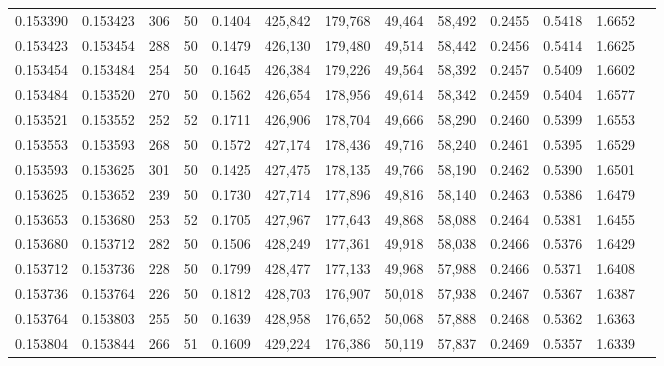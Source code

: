 \begin{tabular}{rrrrrrrrrrrrr}
0.153390 & 0.153423 &   306 &  50 &                                     0.1404 & 425,842 & 179,768 &  49,464 &  58,492 & 0.2455 & 0.5418 & 1.6652 \\
0.153423 & 0.153454 &   288 &  50 &                                     0.1479 & 426,130 & 179,480 &  49,514 &  58,442 & 0.2456 & 0.5414 & 1.6625 \\
0.153454 & 0.153484 &   254 &  50 &                                     0.1645 & 426,384 & 179,226 &  49,564 &  58,392 & 0.2457 & 0.5409 & 1.6602 \\
0.153484 & 0.153520 &   270 &  50 &                                     0.1562 & 426,654 & 178,956 &  49,614 &  58,342 & 0.2459 & 0.5404 & 1.6577 \\
0.153521 & 0.153552 &   252 &  52 &                                     0.1711 & 426,906 & 178,704 &  49,666 &  58,290 & 0.2460 & 0.5399 & 1.6553 \\
0.153553 & 0.153593 &   268 &  50 &                                     0.1572 & 427,174 & 178,436 &  49,716 &  58,240 & 0.2461 & 0.5395 & 1.6529 \\
0.153593 & 0.153625 &   301 &  50 &                                     0.1425 & 427,475 & 178,135 &  49,766 &  58,190 & 0.2462 & 0.5390 & 1.6501 \\
0.153625 & 0.153652 &   239 &  50 &                                     0.1730 & 427,714 & 177,896 &  49,816 &  58,140 & 0.2463 & 0.5386 & 1.6479 \\
0.153653 & 0.153680 &   253 &  52 &                                     0.1705 & 427,967 & 177,643 &  49,868 &  58,088 & 0.2464 & 0.5381 & 1.6455 \\
0.153680 & 0.153712 &   282 &  50 &                                     0.1506 & 428,249 & 177,361 &  49,918 &  58,038 & 0.2466 & 0.5376 & 1.6429 \\
0.153712 & 0.153736 &   228 &  50 &                                     0.1799 & 428,477 & 177,133 &  49,968 &  57,988 & 0.2466 & 0.5371 & 1.6408 \\
0.153736 & 0.153764 &   226 &  50 &                                     0.1812 & 428,703 & 176,907 &  50,018 &  57,938 & 0.2467 & 0.5367 & 1.6387 \\
0.153764 & 0.153803 &   255 &  50 &                                     0.1639 & 428,958 & 176,652 &  50,068 &  57,888 & 0.2468 & 0.5362 & 1.6363 \\
0.153804 & 0.153844 &   266 &  51 &                                     0.1609 & 429,224 & 176,386 &  50,119 &  57,837 & 0.2469 & 0.5357 & 1.6339 \\

\end{tabular}
